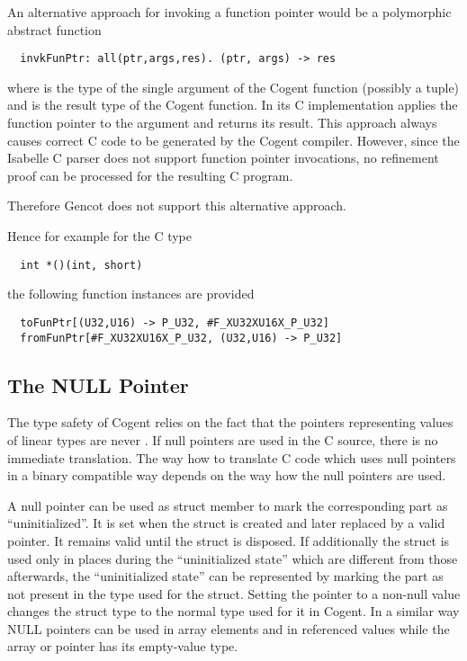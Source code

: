 An alternative approach for invoking a function pointer would be a polymorphic abstract function 
\begin{verbatim}
  invkFunPtr: all(ptr,args,res). (ptr, args) -> res
\end{verbatim}
where  is the type of the single argument of the Cogent function (possibly a tuple) and 
is the result type of the Cogent function. In its C implementation  applies the function pointer
to the argument and returns its result. 
This approach always causes correct C code to be generated by the Cogent compiler. However, since the Isabelle
C parser does not support function pointer invocations, no refinement proof can be processed for the resulting
C program.

Therefore Gencot does not support this alternative approach.

Hence for example for the C type
\begin{verbatim}
  int *()(int, short)
\end{verbatim}
the following function instances are provided
\begin{verbatim}
  toFunPtr[(U32,U16) -> P_U32, #F_XU32XU16X_P_U32]
  fromFunPtr[#F_XU32XU16X_P_U32, (U32,U16) -> P_U32]
\end{verbatim}

\subsection{The NULL Pointer}
\label{design-operations-null}

The type safety of Cogent relies on the fact that the pointers representing values of linear types are never .
If null pointers are used in the C source, there is no immediate translation. The way how to translate C code which uses 
null pointers in a binary compatible way depends on the way how the null pointers are used.

A null pointer can be used as struct member  to mark the corresponding part as ``uninitialized''. 
It is set when the struct is created and later
replaced by a valid pointer. It remains valid until the struct is disposed. If additionally the struct is used only in places
during the ``uninitialized state'' which are different from those afterwards, the ``uninitialized state'' can be represented
by marking the part  as not present in the type used for the struct. Setting the pointer to a non-null value 
changes the struct type to the normal type used for it in Cogent. In a similar way NULL pointers can be used in array
elements and in referenced values while the array or pointer has its empty-value type.

